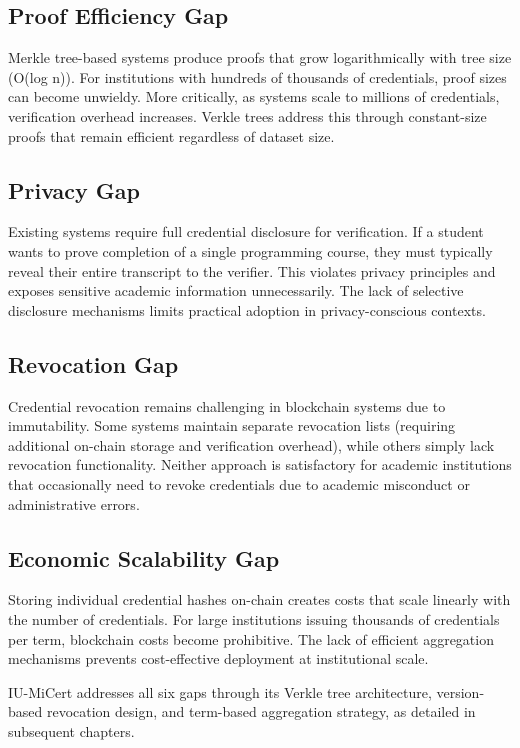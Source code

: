 \subsection{Proof Efficiency Gap}
Merkle tree-based systems produce proofs that grow logarithmically with tree size (O(log n)). For institutions with hundreds of thousands of credentials, proof sizes can become unwieldy. More critically, as systems scale to millions of credentials, verification overhead increases. Verkle trees address this through constant-size proofs that remain efficient regardless of dataset size.

\subsection{Privacy Gap}
Existing systems require full credential disclosure for verification. If a student wants to prove completion of a single programming course, they must typically reveal their entire transcript to the verifier. This violates privacy principles and exposes sensitive academic information unnecessarily. The lack of selective disclosure mechanisms limits practical adoption in privacy-conscious contexts.

\subsection{Revocation Gap}
Credential revocation remains challenging in blockchain systems due to immutability. Some systems maintain separate revocation lists (requiring additional on-chain storage and verification overhead), while others simply lack revocation functionality. Neither approach is satisfactory for academic institutions that occasionally need to revoke credentials due to academic misconduct or administrative errors.

\subsection{Economic Scalability Gap}
Storing individual credential hashes on-chain creates costs that scale linearly with the number of credentials. For large institutions issuing thousands of credentials per term, blockchain costs become prohibitive. The lack of efficient aggregation mechanisms prevents cost-effective deployment at institutional scale.

IU-MiCert addresses all six gaps through its Verkle tree architecture, version-based revocation design, and term-based aggregation strategy, as detailed in subsequent chapters.
